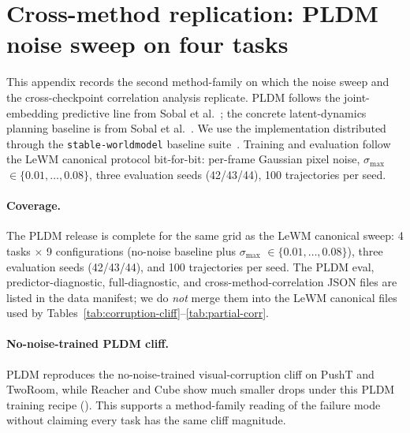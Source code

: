 \documentclass[10pt]{article}
\newcommand{\code}[1]{\texttt{\small #1}}
\newcommand{\stdmax}{\ensuremath{\sigma_{\max}}}
\begin{document}
\section{Cross-method replication: PLDM noise sweep on four tasks}\label{sec:appendix-pldm}

This appendix records the second method-family on which the noise sweep and the cross-checkpoint correlation analysis replicate. PLDM follows the joint-embedding predictive line from Sobal et al.~\cite{sobal2022jointembeddingpredictivearchitectures}; the concrete latent-dynamics planning baseline is from Sobal et al.~\cite{sobal2025stresstesting}. We use the implementation distributed through the \code{stable-worldmodel} baseline suite~\cite{maes2026stableworldmodel}. Training and evaluation follow the LeWM canonical protocol bit-for-bit: per-frame Gaussian pixel noise, \stdmax{} $\in \{0.01,\dots,0.08\}$, three evaluation seeds (42/43/44), 100 trajectories per seed.

\paragraph{Coverage.} The PLDM release is complete for the same grid as the LeWM canonical sweep: 4 tasks $\times$ 9 configurations (no-noise baseline plus \stdmax{} $\in \{0.01,\dots,0.08\}$), three evaluation seeds (42/43/44), and 100 trajectories per seed. The PLDM eval, predictor-diagnostic, full-diagnostic, and cross-method-correlation JSON files are listed in the data manifest; we do \emph{not} merge them into the LeWM canonical files used by Tables~\ref{tab:corruption-cliff}--\ref{tab:partial-corr}.

\paragraph{No-noise-trained PLDM cliff.} PLDM reproduces the no-noise-trained visual-corruption cliff on PushT and TwoRoom, while Reacher and Cube show much smaller drops under this PLDM training recipe (). This supports a method-family reading of the failure mode without claiming every task has the same cliff magnitude.
\end{document}
